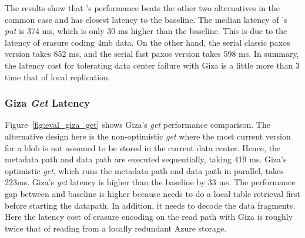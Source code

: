 The results show that \name's performance beats the other two alternatives in the common case and has closest
latency to the baseline. The median latency of \name's {\em put} is 374 ms, which is only 30 ms
higher than the baseline. This is due to the latency of erasure coding 4mb data. On the other hand, the serial classic paxos version takes 
852 ms, and the serial fast paxos version takes 598 ms. In summary, the latency cost for tolerating data center failure with Giza is a little more than 3 time that of local replication.

\subsubsection{Giza {\em Get} Latency}

Figure~\ref{fig:eval_giza_get} shows Giza's {\em get} performance comparison. The alternative design here is the non-optimistic {\em get } where the most current version for a blob is not assumed to be stored in the current data center. Hence, the metadata path and data path are executed sequentially, taking 419 ms. Giza's optimistic {\em get}, which runs the metadata path and data path in parallel, takes 223ms. Giza's {\em get} latency is higher than the baseline by 33 ms. The performance gap between \name and baseline is higher because \name needs to do a local table retrieval first before starting the datapath. In addition, it needs to decode the data fragments. Here the latency cost of erasure encoding on the read path with Giza is roughly twice that of reading from a locally redundant Azure storage.





